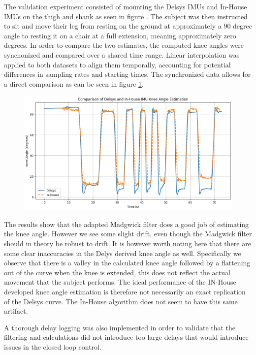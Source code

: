 The validation experiment consisted of mounting the Delsys IMUs and In-House IMUs on the thigh and shank as seen in figure . The subject was then instructed to sit and move their leg from resting on the ground at approximately a 90 degree angle to resting it on a chair at a full extension, meaning approximately zero degrees. In order to compare the two estimates, the computed knee angles were synchonized and compared over a shared time range. Linear interpolation was applied to both datasets to align them temporally, accounting for potential differences in sampling rates and starting times. The synchronized data allows for a direct comparison as can be seen in figure \ref{fig:t11}. 

\begin{figure} [H]
    \centering
    \includegraphics[width=0.95\linewidth]{images/T11_betterplotting.png}
    \caption{}
    \label{fig:t11}
\end{figure}

The results show that the adapted Madgwick filter does a good job of estimating the knee angle. However we see some slight drift, even though the Madgwick filter should in theory be robust to drift. It is however worth noting here that there are some clear inaccuracies in the Delys derived knee angle as well. Specifically we observe that there is a valley in the calculated knee angle followed by a flattening out of the curve when the knee is extended, this does not reflect the actual movement that the subject performs. The ideal performance of the IN-House developed knee angle estimation is therefore not necessarily an exact replication of the Delsys curve. The In-House algorithm does not seem to have this same artifact.

A thorough delay logging was also implemented in order to validate that the filtering and calculations did not introduce too large delays that would introduce issues in the closed loop control. 



